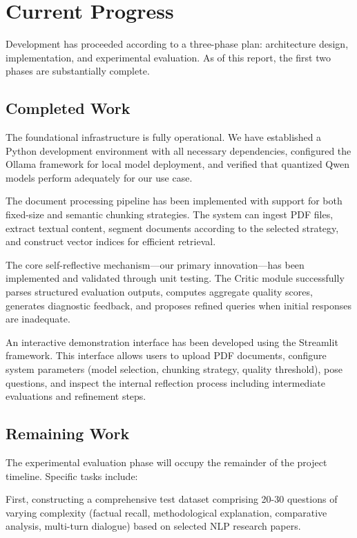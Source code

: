 \documentclass[11pt,a4paper]{article}
\begin{document}
\section{Current Progress}

Development has proceeded according to a three-phase plan: architecture design, implementation, and experimental evaluation. As of this report, the first two phases are substantially complete.

\subsection{Completed Work}

The foundational infrastructure is fully operational. We have established a Python development environment with all necessary dependencies, configured the Ollama framework for local model deployment, and verified that quantized Qwen models perform adequately for our use case.

The document processing pipeline has been implemented with support for both fixed-size and semantic chunking strategies. The system can ingest PDF files, extract textual content, segment documents according to the selected strategy, and construct vector indices for efficient retrieval.

The core self-reflective mechanism—our primary innovation—has been implemented and validated through unit testing. The Critic module successfully parses structured evaluation outputs, computes aggregate quality scores, generates diagnostic feedback, and proposes refined queries when initial responses are inadequate.

An interactive demonstration interface has been developed using the Streamlit framework. This interface allows users to upload PDF documents, configure system parameters (model selection, chunking strategy, quality threshold), pose questions, and inspect the internal reflection process including intermediate evaluations and refinement steps.

\subsection{Remaining Work}

The experimental evaluation phase will occupy the remainder of the project timeline. Specific tasks include:

First, constructing a comprehensive test dataset comprising 20-30 questions of varying complexity (factual recall, methodological explanation, comparative analysis, multi-turn dialogue) based on selected NLP research papers.
\end{document}

